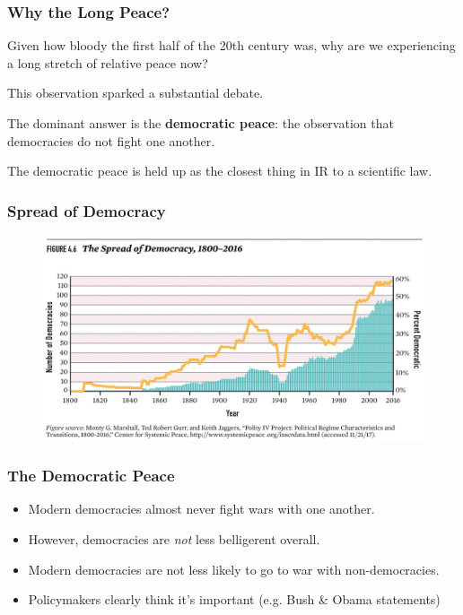 \documentclass[handout]{beamer}
\begin{document}
\begin{frame} 
\frametitle{\LARGE{Why the Long Peace?}}
\begin{itemize}
	\large{
		\item Given how bloody the first half of the 20th century was, why are we experiencing a long stretch of relative peace now? \pause 
		\item This observation sparked a substantial debate. \pause 
        \item The dominant answer is the \textbf{democratic peace}: the observation that democracies do not fight one another. \pause 
	    \item The democratic peace is held up as the closest thing in IR to a scientific law.
	}
\end{itemize}
\end{frame}

\begin{frame} 
	\frametitle{\LARGE{Spread of Democracy}}
	\begin{figure}[ht!]
		\centering
		\includegraphics[width=\textwidth,height=0.8\textheight,keepaspectratio]{Demspread.jpg}
	\end{figure}
\end{frame}

\begin{frame} 
\frametitle{\LARGE{The Democratic Peace}}
\begin{itemize}
		\item Modern democracies almost never fight wars with one another. \pause 
		\item However, democracies are \emph{not} less belligerent overall. \pause 
		\item Modern democracies are not less likely to go to war with non-democracies. \pause
		\item Policymakers clearly think it's important (e.g. Bush \& Obama statements)
\end{itemize}
\end{frame}
\end{document}
